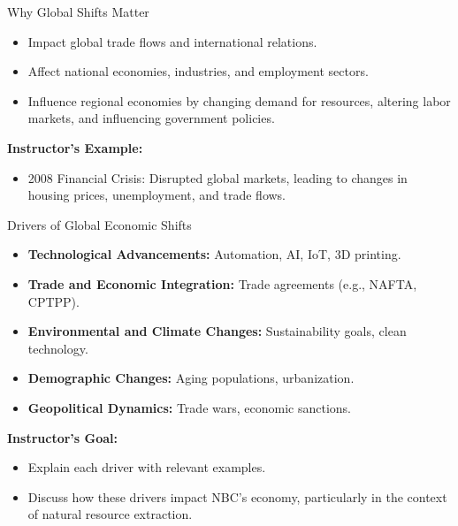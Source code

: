 \documentclass{beamer}
\begin{document}
\begin{frame}{Why Global Shifts Matter}
    \begin{itemize}
        \item Impact global trade flows and international relations.
        \item Affect national economies, industries, and employment sectors.
        \item Influence regional economies by changing demand for resources, altering labor markets, and influencing government policies.
    \end{itemize}
    \textbf{Instructor's Example:}
    \begin{itemize}
        \item 2008 Financial Crisis: Disrupted global markets, leading to changes in housing prices, unemployment, and trade flows.
    \end{itemize}
\end{frame}

\begin{frame}{Drivers of Global Economic Shifts}
    \begin{itemize}
        \item \textbf{Technological Advancements:} Automation, AI, IoT, 3D printing.
        \item \textbf{Trade and Economic Integration:} Trade agreements (e.g., NAFTA, CPTPP).
        \item \textbf{Environmental and Climate Changes:} Sustainability goals, clean technology.
        \item \textbf{Demographic Changes:} Aging populations, urbanization.
        \item \textbf{Geopolitical Dynamics:} Trade wars, economic sanctions.
    \end{itemize}
    \textbf{Instructor’s Goal:}
    \begin{itemize}
        \item Explain each driver with relevant examples.
        \item Discuss how these drivers impact NBC’s economy, particularly in the context of natural resource extraction.
    \end{itemize}
\end{frame}
\end{document}
